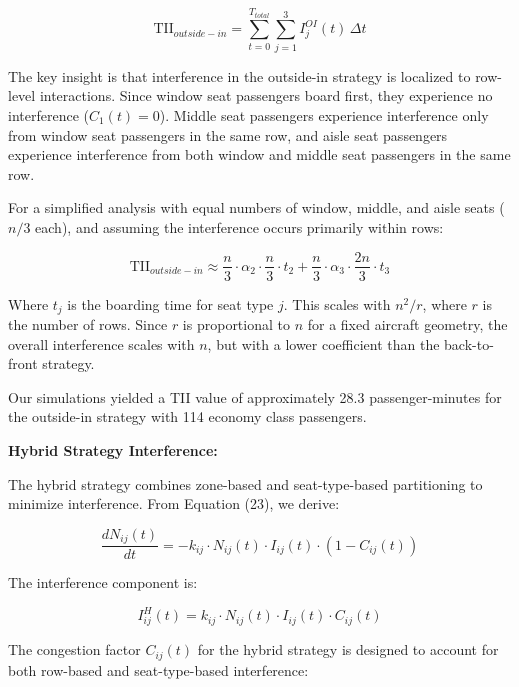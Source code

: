 \begin{equation}
\text{TII}_{outside-in} = \sum_{t=0}^{T_{total}} \sum_{j=1}^{3} I_j^{OI}(t) \, \Delta t
\end{equation}

The key insight is that interference in the outside-in strategy is localized to row-level interactions. Since window seat passengers board first, they experience no interference ($C_1(t) = 0$). Middle seat passengers experience interference only from window seat passengers in the same row, and aisle seat passengers experience interference from both window and middle seat passengers in the same row.

For a simplified analysis with equal numbers of window, middle, and aisle seats ($n/3$ each), and assuming the interference occurs primarily within rows:

\begin{equation}
\text{TII}_{outside-in} \approx \frac{n}{3} \cdot \alpha_2 \cdot \frac{n}{3} \cdot t_2 + \frac{n}{3} \cdot \alpha_3 \cdot \frac{2n}{3} \cdot t_3
\end{equation}

Where $t_j$ is the boarding time for seat type $j$. This scales with $n^2/r$, where $r$ is the number of rows. Since $r$ is proportional to $n$ for a fixed aircraft geometry, the overall interference scales with $n$, but with a lower coefficient than the back-to-front strategy.

Our simulations yielded a TII value of approximately 28.3 passenger-minutes for the outside-in strategy with 114 economy class passengers.

\textbf{Hybrid Strategy Interference:}

The hybrid strategy combines zone-based and seat-type-based partitioning to minimize interference. From Equation (23), we derive:

\begin{equation}
\frac{dN_{ij}(t)}{dt} = -k_{ij} \cdot N_{ij}(t) \cdot I_{ij}(t) \cdot (1 - C_{ij}(t))
\end{equation}

The interference component is:

\begin{equation}
I_{ij}^{H}(t) = k_{ij} \cdot N_{ij}(t) \cdot I_{ij}(t) \cdot C_{ij}(t)
\end{equation}

The congestion factor $C_{ij}(t)$ for the hybrid strategy is designed to account for both row-based and seat-type-based interference:

